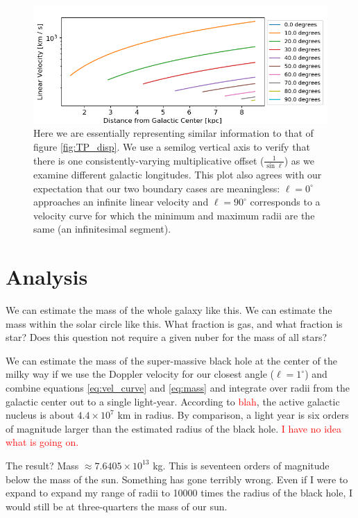 \documentclass[12pt]{article}
\begin{document}
\begin{figure}
	\centering
	\includegraphics[width=.9\linewidth]{tangentPoint_selected_dispersions}
	\caption{Here we are essentially representing similar information to that of figure \ref{fig:TP_disp}. We use a semilog vertical axis to verify that there is one consistently-varying multiplicative offset ($\frac{1}{\sin \ell}$) as we examine different galactic longitudes. This plot also agrees with our expectation that our two boundary cases are meaningless: $\ell = 0^\circ$ approaches an infinite linear velocity and $\ell = 90^\circ$ corresponds to a velocity curve for which the minimum and maximum radii are the same (an infinitesimal segment).}
	\label{fig:TP_sel_disp}
\end{figure}

\section{Analysis}

\quad \quad We can estimate the mass of the whole galaxy like this. We can estimate the mass within the solar circle like this. What fraction is gas, and what fraction is star? Does this question not require a given nuber for the mass of all stars?

We can estimate the mass of the super-massive black hole at the center of the milky way if we use the Doppler velocity for our closest angle ($\ell = 1^\circ$) and combine equations \ref{eq:vel_curve} and \ref{eq:mass} and integrate over radii from the galactic center out to a single light-year. According to \textcolor{red}{blah}, the active galactic nucleus is about $4.4 \times 10^{7}$ km in radius. By comparison, a light year is six orders of magnitude larger than the estimated radius of the black hole. \textcolor{red}{I have no idea what is going on.}

The result? Mass $\approx 7.6405 \times 10^{13}$ kg. This is seventeen orders of magnitude below the mass of the sun. Something has gone terribly wrong. Even if I were to expand to expand my range of radii to 10000 times the radius of the black hole, I would still be at three-quarters the mass of our sun. 
\end{document}
